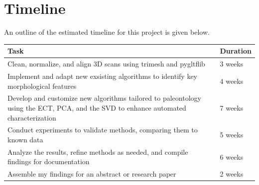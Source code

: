 \documentclass[12pt]{article}
\begin{document}
\section{Timeline}
An outline of the estimated timeline for this project is given below.


\begin{table}[h!]
\centering
\setlength{\tabcolsep}{10pt}
\renewcommand{\arraystretch}{1}
\begin{tabular}{|p{12cm}|p{2.5cm}|}
\hline
\textbf{Task} & \textbf{Duration} \\
\hline
Clean, normalize, and align 3D scans using trimesh and pygltflib & 3 weeks \\
Implement and adapt new exsisting algorithms to identify key morphological
features & 4 weeks \\
Develop and customize new algorithms tailored to paleontology using the ECT,
PCA, and the SVD to enhance automated characterization & 7 weeks \\
Conduct experiments to validate methods, comparing them to known data & 5 weeks \\
Analyze the results, refine methods as needed, and compile findings for
documentation & 6 weeks \\
Assemble my findings for an abstract or research paper & 2 weeks \\
\hline
\end{tabular}
\end{table}
\end{document}
